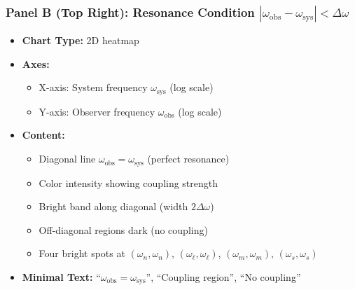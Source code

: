 \subsubsection*{Panel B (Top Right): Resonance Condition $|\omega_{\text{obs}} - \omega_{\text{sys}}| < \Delta\omega$}
\begin{itemize}
\item \textbf{Chart Type:} 2D heatmap
\item \textbf{Axes:}
  \begin{itemize}
  \item X-axis: System frequency $\omega_{\text{sys}}$ (log scale)
  \item Y-axis: Observer frequency $\omega_{\text{obs}}$ (log scale)
  \end{itemize}
\item \textbf{Content:}
  \begin{itemize}
  \item Diagonal line $\omega_{\text{obs}} = \omega_{\text{sys}}$ (perfect resonance)
  \item Color intensity showing coupling strength
  \item Bright band along diagonal (width $2\Delta\omega$)
  \item Off-diagonal regions dark (no coupling)
  \item Four bright spots at $(\omega_n,\omega_n)$, $(\omega_\ell,\omega_\ell)$, $(\omega_m,\omega_m)$, $(\omega_s,\omega_s)$
  \end{itemize}
\item \textbf{Minimal Text:} ``$\omega_{\text{obs}} = \omega_{\text{sys}}$'', ``Coupling region'', ``No coupling''
\end{itemize}

